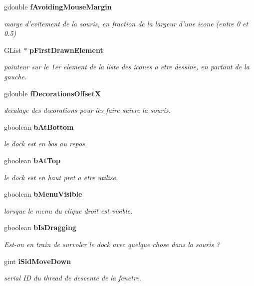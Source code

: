 \begin{CompactItemize}
gdouble {\bf fAvoidingMouseMargin}
\begin{CompactList}\small\item\em marge d'evitement de la souris, en fraction de la largeur d'une icone (entre 0 et 0.5) \item\end{CompactList}\item 
GList $\ast$ {\bf pFirstDrawnElement}
\begin{CompactList}\small\item\em pointeur sur le 1er element de la liste des icones a etre dessine, en partant de la gauche. \item\end{CompactList}\item 
gdouble {\bf fDecorationsOffsetX}
\begin{CompactList}\small\item\em decalage des decorations pour les faire suivre la souris. \item\end{CompactList}\item 
gboolean {\bf bAtBottom}
\begin{CompactList}\small\item\em le dock est en bas au repos. \item\end{CompactList}\item 
gboolean {\bf bAtTop}
\begin{CompactList}\small\item\em le dock est en haut pret a etre utilise. \item\end{CompactList}\item 
gboolean {\bf bMenuVisible}
\begin{CompactList}\small\item\em lorsque le menu du clique droit est visible. \item\end{CompactList}\item 
gboolean {\bf bIsDragging}
\begin{CompactList}\small\item\em Est-on en train de survoler le dock avec quelque chose dans la souris ? \item\end{CompactList}\item 
gint {\bf iSidMoveDown}
\begin{CompactList}\small\item\em serial ID du thread de descente de la fenetre. \item\end{CompactList}\item 

\end{CompactItemize}

